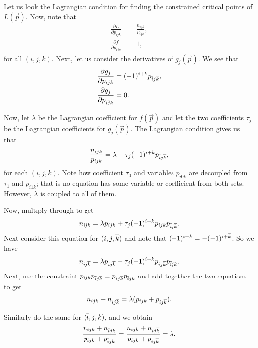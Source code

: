Let us look the Lagrangian condition for finding the constrained critical points of \(L(\vec p)\).
Now, note that 
\begin{align}
\frac{\partial L}{\partial p_{ijk}} & = \frac{n_{ijk}} {p_{ijk}}, \\
\frac{\partial f}{\partial p_{ijk}} & = 1,
\end{align}
for all \((i, j, k)\). Next, let us consider the derivatives of \(g_j(\vec p)\). We see that
\begin{align}
\frac{\partial g_j}{\partial p_{ijk}} & = (-1)^{i + k} p_{\overline{i} j\overline{k}}, \\
\frac{\partial g_j}{\partial p_{i\overline{j}k} } & = 0.
\end{align}

Now, let \(\lambda\) be the Lagrangian coefficient for \(f(\vec p)\) and let the two coefficients \(\tau_j\)
be the Lagrangian coefficients for \(g_j(\vec p)\). The Lagrangian condition gives us that
\begin{equation}
\frac{n_{ijk}} {p_{ijk}} = \lambda + \tau_j (-1)^{i + k} p_{\overline{i} j\overline{k}},
\end{equation}
for each \((i, j, k)\). Note how coefficient \(\tau_0\) and variables \(p_{i0k}\) are 
decoupled from \(\tau_1\) and \(p_{i1k}\); that is no equation has some variable or coefficient from both sets. 
However, \(\lambda\) is coupled to all of them.

Now, multiply through to get
\begin{equation}
n_{ijk} = \lambda p_{ijk} + \tau_j (-1)^{i + k} p_{ijk} p_{\overline{i}j\overline{k}}.
\end{equation}
Next consider this equation for \((i, j, \overline{k})\) and note that \((-1)^{i+k} = -(-1)^{i + \overline{k}}\). So
we have
\begin{equation}
n_{ij\overline{k}} = \lambda p_{ij\overline{k}} - \tau_j (-1)^{i + k} p_{ij\overline{k}} p_{\overline{i}jk}.
\end{equation}
Next, use the constraint \(p_{ijk}p_{\overline{i}j\overline{k}} = p_{ij\overline{k}}p_{\overline{i}jk}\) and add together the 
two equations to get
\begin{equation}
n_{ijk} + n_{ij\overline{k}} = \lambda(p_{ijk} + p_{ij\overline{k}}).
\end{equation}

Similarly do the same for \((\overline{i}, j, k)\), and we obtain
\begin{equation}
\frac{n_{ijk} + n_{\overline{i}jk}} {p_{ijk} + p_{\overline{i}jk}} = 
    \frac{n_{ijk} + n_{ij\overline{k}}} {p_{ijk} + p_{ij\overline{k}}} =
    \lambda.
\end{equation}

